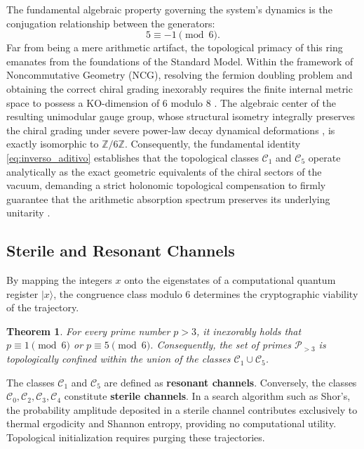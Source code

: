 \documentclass[reprint,aps,pra,superscriptaddress,nofootinbib]{revtex4-2}
\theoremstyle{plain}
\newtheorem{theorem}{Theorem}[section]
\theoremstyle{definition}
\theoremstyle{remark}
\begin{document}
The fundamental algebraic property governing the system's dynamics is the conjugation relationship between the generators:
\begin{equation}
5 \equiv -1 \pmod{6}.
\label{eq:inverso_aditivo}
\end{equation}
Far from being a mere arithmetic artifact, the topological primacy of this ring emanates from the foundations of the Standard Model. Within the framework of Noncommutative Geometry (NCG), resolving the fermion doubling problem and obtaining the correct chiral grading inexorably requires the finite internal metric space to possess a KO-dimension of 6 modulo 8 \cite{Connes2008, Peinador_Emergencia_Geometria_2025}. The algebraic center of the resulting unimodular gauge group, whose structural isometry integrally preserves the chiral grading under severe power-law decay dynamical deformations \cite{Peinador_Modular_Quantum_Chaos_2026}, is exactly isomorphic to $\mathbb{Z}/6\mathbb{Z}$. Consequently, the fundamental identity \eqref{eq:inverso_aditivo} establishes that the topological classes $\mathcal{C}_1$ and $\mathcal{C}_5$ operate analytically as the exact geometric equivalents of the chiral sectors of the vacuum, demanding a strict holonomic topological compensation to firmly guarantee that the arithmetic absorption spectrum preserves its underlying unitarity \cite{Peinador_Dualidad_Riemann_2026, Peinador_Modular_Quantum_Chaos_2026}.

\subsection{Sterile and Resonant Channels}

By mapping the integers $x$ onto the eigenstates of a computational quantum register $|x\rangle$, the congruence class modulo 6 determines the cryptographic viability of the trajectory. 

\begin{theorem}
For every prime number $p>3$, it inexorably holds that $p \equiv 1 \pmod{6}$ or $p \equiv 5 \pmod{6}$. Consequently, the set of primes $\mathcal{P}_{>3}$ is topologically confined within the union of the classes $\mathcal{C}_1 \cup \mathcal{C}_5$.
\end{theorem}

The classes $\mathcal{C}_1$ and $\mathcal{C}_5$ are defined as \textbf{resonant channels}. Conversely, the classes $\mathcal{C}_0,\mathcal{C}_2,\mathcal{C}_3,\mathcal{C}_4$ constitute \textbf{sterile channels}. In a search algorithm such as Shor's, the probability amplitude deposited in a sterile channel contributes exclusively to thermal ergodicity and Shannon entropy, providing no computational utility. Topological initialization requires purging these trajectories.
\end{document}
